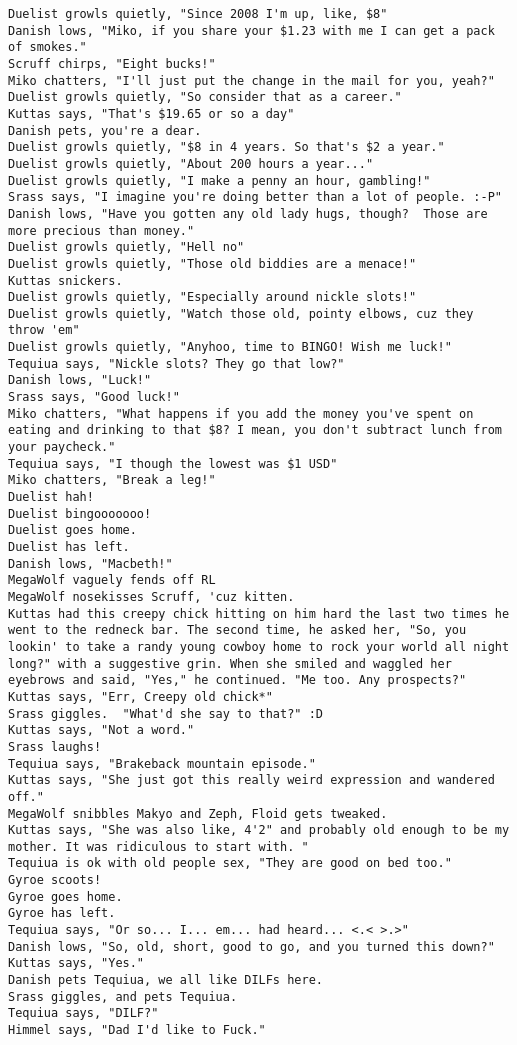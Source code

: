 \begin{verbatim}
Duelist growls quietly, "Since 2008 I'm up, like, $8"
Danish lows, "Miko, if you share your $1.23 with me I can get a pack of smokes."
Scruff chirps, "Eight bucks!"
Miko chatters, "I'll just put the change in the mail for you, yeah?"
Duelist growls quietly, "So consider that as a career."
Kuttas says, "That's $19.65 or so a day"
Danish pets, you're a dear.
Duelist growls quietly, "$8 in 4 years. So that's $2 a year."
Duelist growls quietly, "About 200 hours a year..."
Duelist growls quietly, "I make a penny an hour, gambling!"
Srass says, "I imagine you're doing better than a lot of people. :-P"
Danish lows, "Have you gotten any old lady hugs, though?  Those are more precious than money."
Duelist growls quietly, "Hell no"
Duelist growls quietly, "Those old biddies are a menace!"
Kuttas snickers.
Duelist growls quietly, "Especially around nickle slots!"
Duelist growls quietly, "Watch those old, pointy elbows, cuz they throw 'em"
Duelist growls quietly, "Anyhoo, time to BINGO! Wish me luck!"
Tequiua says, "Nickle slots? They go that low?"
Danish lows, "Luck!"
Srass says, "Good luck!"
Miko chatters, "What happens if you add the money you've spent on eating and drinking to that $8? I mean, you don't subtract lunch from your paycheck."
Tequiua says, "I though the lowest was $1 USD"
Miko chatters, "Break a leg!"
Duelist hah!
Duelist bingooooooo!
Duelist goes home.
Duelist has left.
Danish lows, "Macbeth!"
MegaWolf vaguely fends off RL
MegaWolf nosekisses Scruff, 'cuz kitten.
Kuttas had this creepy chick hitting on him hard the last two times he went to the redneck bar. The second time, he asked her, "So, you lookin' to take a randy young cowboy home to rock your world all night long?" with a suggestive grin. When she smiled and waggled her eyebrows and said, "Yes," he continued. "Me too. Any prospects?"
Kuttas says, "Err, Creepy old chick*"
Srass giggles.  "What'd she say to that?" :D
Kuttas says, "Not a word."
Srass laughs!
Tequiua says, "Brakeback mountain episode."
Kuttas says, "She just got this really weird expression and wandered off."
MegaWolf snibbles Makyo and Zeph, Floid gets tweaked.
Kuttas says, "She was also like, 4'2" and probably old enough to be my mother. It was ridiculous to start with. "
Tequiua is ok with old people sex, "They are good on bed too."
Gyroe scoots!
Gyroe goes home.
Gyroe has left.
Tequiua says, "Or so... I... em... had heard... <.< >.>"
Danish lows, "So, old, short, good to go, and you turned this down?"
Kuttas says, "Yes."
Danish pets Tequiua, we all like DILFs here.
Srass giggles, and pets Tequiua.
Tequiua says, "DILF?"
Himmel says, "Dad I'd like to Fuck."

\end{verbatim}
